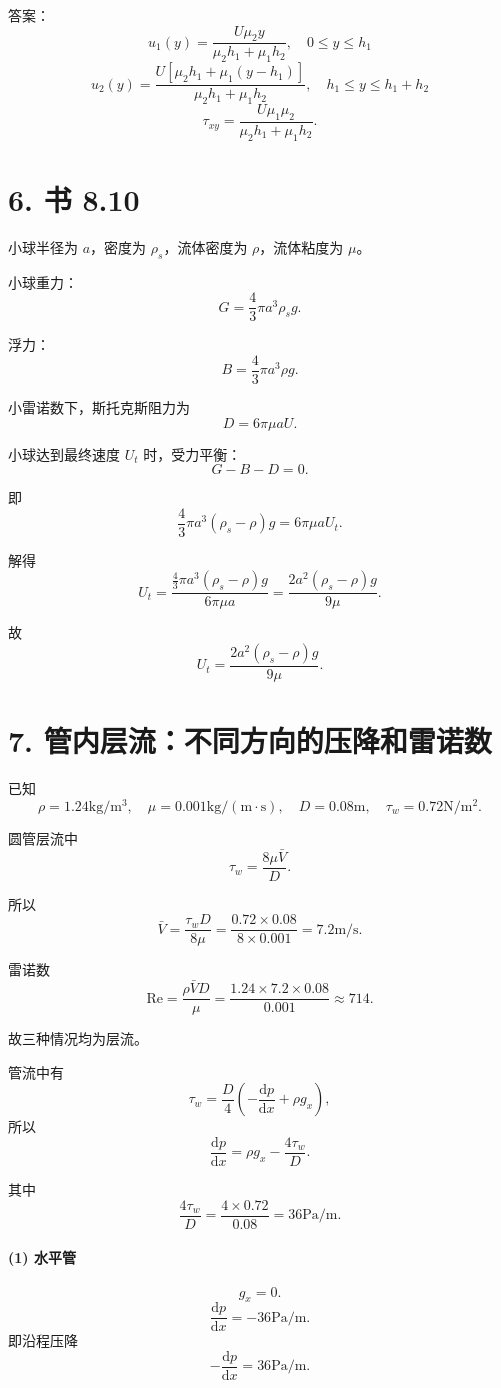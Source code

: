 \documentclass[12pt,a4paper]{ctexart}
\newcommand{\Rey}{\mathrm{Re}}
\newcommand{\dd}{\mathrm d}
\begin{document}
答案：
\[
\boxed{
u_1(y)=
\frac{U\mu_2 y}{\mu_2h_1+\mu_1h_2},
\quad 0\le y\le h_1
}
\]
\[
\boxed{
u_2(y)=
\frac{U\left[\mu_2h_1+\mu_1(y-h_1)\right]}
{\mu_2h_1+\mu_1h_2},
\quad h_1\le y\le h_1+h_2
}
\]
\[
\boxed{
\tau_{xy}=
\frac{U\mu_1\mu_2}{\mu_2h_1+\mu_1h_2}
}.
\]

\section*{6. 书 8.10}

小球半径为 \(a\)，密度为 \(\rho_s\)，流体密度为 \(\rho\)，流体粘度为 \(\mu\)。

小球重力：
\[
G=\frac43\pi a^3\rho_s g.
\]

浮力：
\[
B=\frac43\pi a^3\rho g.
\]

小雷诺数下，斯托克斯阻力为
\[
D=6\pi\mu aU.
\]

小球达到最终速度 \(U_t\) 时，受力平衡：
\[
G-B-D=0.
\]

即
\[
\frac43\pi a^3(\rho_s-\rho)g
=6\pi\mu aU_t.
\]

解得
\[
U_t=
\frac{\frac43\pi a^3(\rho_s-\rho)g}{6\pi\mu a}
=
\frac{2a^2(\rho_s-\rho)g}{9\mu}.
\]

故
\[
\boxed{
U_t=\frac{2a^2(\rho_s-\rho)g}{9\mu}
}.
\]

\section*{7. 管内层流：不同方向的压降和雷诺数}

已知
\[
\rho=1.24\mathrm{kg/m^3},\quad
\mu=0.001\mathrm{kg/(m\cdot s)},\quad
D=0.08\mathrm m,\quad
\tau_w=0.72\mathrm{N/m^2}.
\]

圆管层流中
\[
\tau_w=\frac{8\mu \bar V}{D}.
\]

所以
\[
\bar V=\frac{\tau_wD}{8\mu}
=\frac{0.72\times0.08}{8\times0.001}
=7.2\mathrm{m/s}.
\]

雷诺数
\[
\Rey=\frac{\rho \bar VD}{\mu}
=\frac{1.24\times7.2\times0.08}{0.001}
\approx714.
\]

故三种情况均为层流。

管流中有
\[
\tau_w=\frac{D}{4}\left(-\frac{\dd p}{\dd x}+\rho g_x\right),
\]
所以
\[
\frac{\dd p}{\dd x}
=\rho g_x-\frac{4\tau_w}{D}.
\]

其中
\[
\frac{4\tau_w}{D}
=\frac{4\times0.72}{0.08}
=36\mathrm{Pa/m}.
\]

\paragraph{(1) 水平管}
\[
g_x=0.
\]
\[
\frac{\dd p}{\dd x}=-36\mathrm{Pa/m}.
\]
即沿程压降
\[
-\frac{\dd p}{\dd x}=36\mathrm{Pa/m}.
\]
\end{document}

